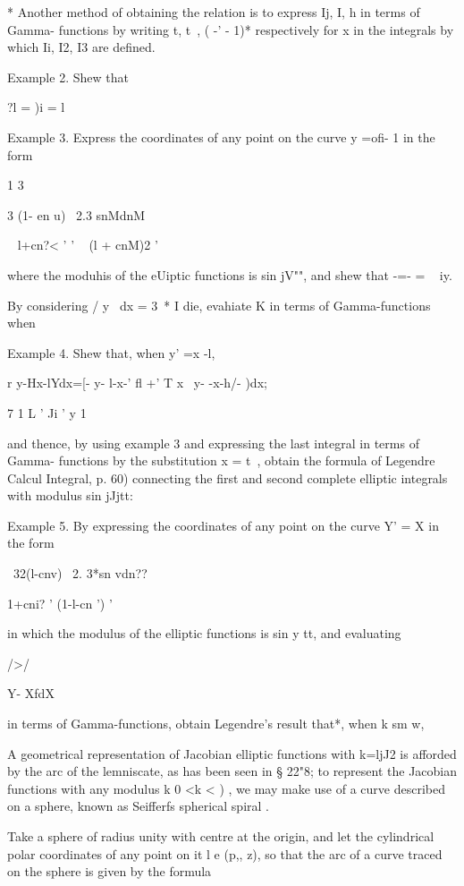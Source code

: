 * Another method of obtaining the relation is to express Ij, I, h in
terms of Gamma- functions by writing t, t~, ( -' - 1)* respectively
for x in the integrals by which Ii, I2, I3 are defined.

%
%

Example 2. Shew that

?l = )i = l

Example 3. Express the coordinates of any
point on the curve y =ofi- 1 in the form

1 3

3 (1- en u) \ 2.3 snMdnM

 ~ l+cn?< ' ' ~ (l + cnM)2 '

where the moduhis of the eUiptic functions is sin jV"", and shew that
-=- = ~ iy.

By considering / y~ dx = 3~* I die, evahiate K in terms of
Gamma-functions when

Example 4. Shew that, when y' =x -l,

r y-Hx-lYdx=[- y- l-x-' fl +' T x~ y- -x-h/- )dx;

7 1 L ' Ji ' y 1

and thence, by using example 3 and expressing the last integral in
terms of Gamma- functions by the substitution x = t~, obtain the
formula of Legendre Calcul Integral, p. 60) connecting the first and
second complete elliptic integrals with modulus sin jJjtt:

Example 5. By expressing the coordinates of any point on the curve Y'
= X in the form

 \ 32(l-cnv) \ 2. 3*sn vdn??

1+cni? ' (1-l-cn ') '

in which the modulus of the elliptic functions is sin y tt, and
evaluating

 />/

Y- XfdX

in terms of Gamma-functions, obtain Legendre's result that*, when k sm
w,


A geometrical representation of Jacobian elliptic functions with
k=ljJ2 is afforded by the arc of the lemniscate, as has been seen in §
22"8; to represent the Jacobian functions with any modulus k 0 <k < )
, we may make use of a curve described on a sphere, known as Seifferfs
spherical spiral .

Take a sphere of radius unity with centre at the origin, and let the
cylindrical polar coordinates of any point on it l e (p,, z), so that
the arc of a curve traced on the sphere is given by the formula \

